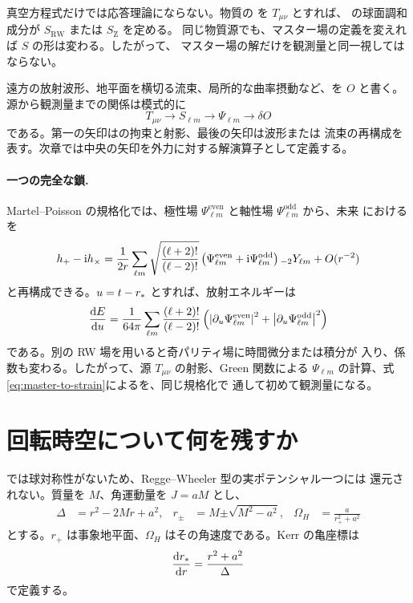 真空方程式だけでは応答理論にならない。物質の  を $T_{\mu\nu}$ とすれば、
の球面調和成分が $S_{\mathrm{RW}}$ または $S_{\mathrm Z}$ を定める。
同じ物質源でも、マスター場の定義を変えれば $S$ の形は変わる。したがって、
マスター場の解だけを観測量と同一視してはならない。

遠方の放射波形、地平面を横切る流束、局所的な曲率摂動など、を $O$ と書く。
源から観測量までの関係は模式的に
\begin{equation}
T_{\mu\nu}
\longrightarrow
S_{\ell m}
\longrightarrow
\Psi_{\ell m}
\longrightarrow
\delta O
\label{eq:source-master-observable-chain}
\end{equation}
である。第一の矢印はの拘束と射影、最後の矢印は波形または
流束の再構成を表す。次章では中央の矢印を外力に対する解演算子として定義する。

\paragraph{一つの完全な鎖.}
Martel--Poisson の規格化では、極性場 $\Psi^{\mathrm{even}}_{\ell m}$ と軸性場
$\Psi^{\mathrm{odd}}_{\ell m}$ から、未来  におけるを
\begin{equation}
h_+-\mathrm{i} h_\times
=
\frac{1}{2r}
\sum_{\ell m}
\sqrt{\frac{(\ell+2)!}{(\ell-2)!}}
\left(
\Psi^{\mathrm{even}}_{\ell m}
+\mathrm{i}\Psi^{\mathrm{odd}}_{\ell m}
\right)
{}_{-2}Y_{\ell m}
+O(r^{-2})
\label{eq:master-to-strain}
\end{equation}
と再構成できる。$u=t-r_*$ とすれば、放射エネルギーは
\begin{equation}
\frac{\mathrm{d} E}{\mathrm{d} u}
=
\frac{1}{64\pi}
\sum_{\ell m}
\frac{(\ell+2)!}{(\ell-2)!}
\left(
\left|\partial_u\Psi^{\mathrm{even}}_{\ell m}\right|^2
+
\left|\partial_u\Psi^{\mathrm{odd}}_{\ell m}\right|^2
\right)
\label{eq:master-to-energy-flux}
\end{equation}
である\cite{Martel:2005ir}。別の RW 場を用いると奇パリティ場に時間微分または積分が
入り、係数も変わる。したがって、源 $T_{\mu\nu}$ の射影、Green 関数による
$\Psi_{\ell m}$ の計算、式\eqref{eq:master-to-strain}によるを、同じ規格化で
通して初めて観測量になる。

\section{回転時空について何を残すか}

では球対称性がないため、Regge--Wheeler 型の実ポテンシャル一つには
還元されない。質量を $M$、角運動量を $J=aM$ とし、
\begin{align}
\Delta
&=
r^2-2Mr+a^2,
&
r_\pm
&=
M\mathord{\pm}\sqrt{M^2-a^2},
&
\Omega_H
&=
\frac{a}{r_+^2+a^2}
\label{eq:kerr-horizon-minimum}
\end{align}
とする。$r_+$ は事象地平面、$\Omega_H$ はその角速度である。Kerr の亀座標は
\begin{equation}
\frac{\mathrm{d}r_*}{\mathrm{d} r}
=
\frac{r^2+a^2}{\Delta}
\label{eq:kerr-tortoise-minimum}
\end{equation}
で定義する。


